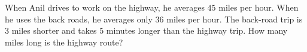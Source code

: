 When Anil drives to work on the highway, he averages $45$ miles per hour. When he uses the back roads, he averages only $36$ miles per hour. The back-road trip is $3$ miles shorter and takes $5$ minutes longer than the highway trip. How many miles long is the highway route?
